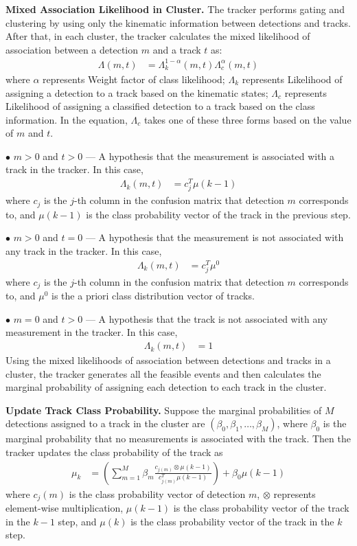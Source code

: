 \documentclass[lettersize,journal]{IEEEtran}
\begin{document}
\textbf{Mixed Association Likelihood in Cluster.}
The tracker performs gating and clustering by using only the kinematic information between detections and tracks. 
After that, in each cluster, the tracker calculates the mixed likelihood of association between a detection $m$ and a track $t$ as:
\begin{align}
	\Lambda(m, t) & = \Lambda_{k}^{1-\alpha}(m, t) \Lambda_{c}^{\alpha}(m, t)
\end{align}
where $\alpha$ represents Weight factor of class likelihood; $\Lambda_{k}$ represents Likelihood of assigning a detection to a track based on the kinematic states; $\Lambda_{c}$ represents Likelihood of assigning a classified detection to a track based on the class information.
In the equation, $\Lambda_{c}$ takes one of these three forms based on the value of $m$ and $t$.

$\bullet$ $m > 0$ and $t > 0$ — A hypothesis that the measurement is associated with a track in the tracker. 
In this case,
\begin{align}
	\Lambda_{k}(m, t) & = c_{j}^{T} \mu(k-1)
\end{align}
where $c_{j}$ is the $j$-th column in the confusion matrix that detection $m$ corresponds to, and $\mu(k-1)$ is the class probability vector of the track in the previous step.

$\bullet$ $m > 0$ and $t = 0$ — A hypothesis that the measurement is not associated with any track in the tracker. In this case,
\begin{align}
	\Lambda_{k}(m, t) & = c_{j}^{T} \mu^{0}
\end{align}
where $c_{j}$ is the $j$-th column in the confusion matrix that detection $m$ corresponds to, and $\mu^{0}$ is the a priori class distribution vector of tracks.

$\bullet$ $m = 0$ and $t > 0$ — A hypothesis that the track is not associated with any measurement in the tracker. In this case,
\begin{align}
	\Lambda_{k}(m, t) & = 1
\end{align}
Using the mixed likelihoods of association between detections and tracks in a cluster, the tracker generates all the feasible events and then calculates the marginal probability of assigning each detection to each track in the cluster.

\textbf{Update Track Class Probability.}
Suppose the marginal probabilities of $M$ detections assigned to a track in the cluster are $\left(\beta_{0}, \beta_{1}, \ldots, \beta_{M}\right)$, where $\beta_{0}$ is the marginal probability that no measurements is associated with the track. 
Then the tracker updates the class probability of the track as
\begin{align}
	\mu_{k} & = \left(\sum_{m = 1}^{M} \beta_{m} \frac{c_{j(m)} \otimes \mu(k-1)}{c_{j(m)}^{T} \mu(k-1)}\right)+\beta_{0} \mu(k-1)
\end{align}
where $c_{j}(m)$ is the class probability vector of detection $m$, $\otimes$ represents element-wise multiplication, $\mu(k-1)$ is the class probability vector of the track in the $k-1$ step, and $\mu(k)$ is the class probability vector of the track in the $k$ step.
\end{document}
